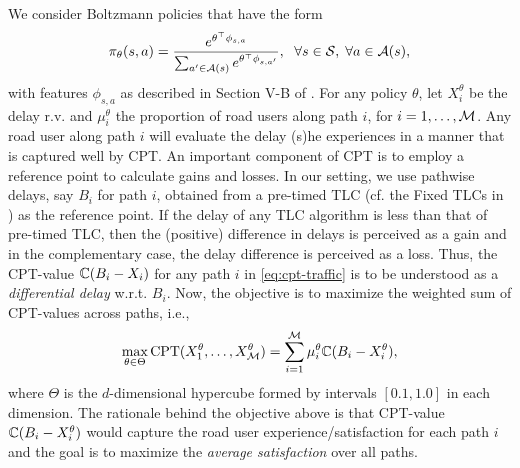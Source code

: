 We consider Boltzmann policies that have the form
$$
\pi_{\theta}(s,a) = \frac{e^{\theta^{\top} \phi_{s,a}}}{\sum_{a' \in {\mathcal{A}(s)}} e^{\theta^{\top} \phi_{s,a'}}},
\hspace{6pt} \forall s \in \mathcal{S},\;\forall a \in \mathcal{A}(s),
$$
with features $\phi_{s,a}$ as described in Section V-B of \cite{prashanth2012threshold}.
For any policy $\theta$, let $X_i^\theta$ be the delay r.v. and $\mu_i^\theta$ the proportion of road users along path $i$, for $i=1,\ldots,\mathcal{M}$. 
Any road user along path $i$ will evaluate the delay (s)he experiences in a manner that is captured well by CPT. 
An important component of CPT is to employ a reference point to calculate gains and losses. 
In our setting, we use pathwise delays, say $B_i$ for path $i$, obtained from a pre-timed TLC (cf. the Fixed TLCs in \cite{prashanth2011reinforcement}) as the reference point.
If the delay of any TLC algorithm is less than that of pre-timed TLC, then the (positive) difference in delays is perceived as a gain and in the complementary case, the delay difference is perceived as a loss. Thus, the CPT-value $\mathbb{C}(B_i-X_i)$ for any path $i$ in \eqref{eq:cpt-traffic} is to be understood as a \textit{differential delay} w.r.t. $B_i$.  
Now, the objective is to maximize the weighted sum of CPT-values across paths, i.e., 
\begin{align}
\max_{\theta \in \Theta} \text{CPT}(X_1^\theta,\ldots,X_{\mathcal{M}}^\theta) = \sum_{i=1}^{\mathcal{M}} \mu_i^\theta \mathbb{C}(B_i - X_i^\theta),\label{eq:cpt-traffic}
\end{align}
where $\Theta$ is the $d$-dimensional hypercube formed by intervals $[0.1,1.0]$ in each dimension. The rationale behind the objective above is that CPT-value $\mathbb{C}(B_i - X_i^\theta)$ would capture the road user experience/satisfaction for each path $i$ and the goal is to maximize the \textit{average satisfaction} over all paths.  

